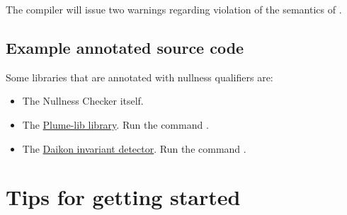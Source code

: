 \noindent
The compiler will issue two warnings regarding violation of the semantics of
.


\subsection{Example annotated source code\label{nullness-annotated-library}}

Some libraries that are annotated with nullness qualifiers are:

\begin{itemize}
\item
The Nullness Checker itself.

\item
The
\href{https://mernst.github.io/plume-lib/}{Plume-lib library}.
Run the command .


\item
The
\href{http://plse.cs.washington.edu/daikon/}{Daikon invariant detector}.
Run the command .

%
%
%

\end{itemize}


\section{Tips for getting started\label{nullness-getting-started}}


